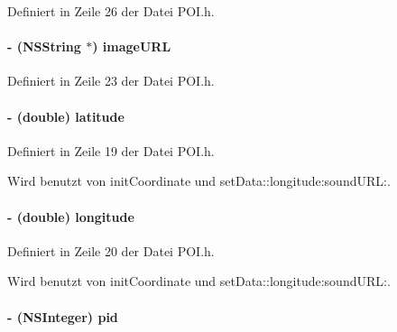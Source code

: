 Definiert in Zeile 26 der Datei POI.h.\hypertarget{interface_p_o_i_af6c6d3845244e4d0608a3782be8dd077}{
\paragraph[{imageURL}]{\setlength{\rightskip}{0pt plus 5cm}-\/ (NSString $\ast$) imageURL}\hfill}
\label{interface_p_o_i_af6c6d3845244e4d0608a3782be8dd077}


Definiert in Zeile 23 der Datei POI.h.\hypertarget{interface_p_o_i_af441df0d8c3d29174ca644414856d497}{
\paragraph[{latitude}]{\setlength{\rightskip}{0pt plus 5cm}-\/ (double) latitude}\hfill}
\label{interface_p_o_i_af441df0d8c3d29174ca644414856d497}


Definiert in Zeile 19 der Datei POI.h.

Wird benutzt von initCoordinate und setData::longitude:soundURL:.\hypertarget{interface_p_o_i_a11947092f2cf76ac7b5ecd2678a376da}{
\paragraph[{longitude}]{\setlength{\rightskip}{0pt plus 5cm}-\/ (double) longitude}\hfill}
\label{interface_p_o_i_a11947092f2cf76ac7b5ecd2678a376da}


Definiert in Zeile 20 der Datei POI.h.

Wird benutzt von initCoordinate und setData::longitude:soundURL:.\hypertarget{interface_p_o_i_a5bfdf0412280b12e34c4fb6e2e1a2db9}{
\paragraph[{pid}]{\setlength{\rightskip}{0pt plus 5cm}-\/ (NSInteger) pid}\hfill}
\label{interface_p_o_i_a5bfdf0412280b12e34c4fb6e2e1a2db9}


